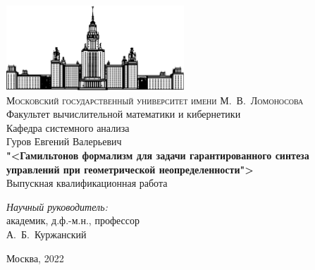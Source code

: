 \begin{titlepage}
    \begin{centering}
        \includegraphics[width=0.5\textwidth]{resources/msu.png}\\
        {\scshape Московский государственный университет имени М.~В.~Ломоносова}\\
        Факультет вычислительной математики и кибернетики\\
        Кафедра системного анализа\\
        \vfill
        {\LARGE Гуров Евгений Валерьевич}\\
        \vspace{1cm}
        {\Huge\bfseries "<Гамильтонов формализм для задачи гарантированного синтеза управлений при геометрической неопределенности">\\}
        \vspace{1cm}
        {\LARGE Выпускная квалификационная работа}\\        
    \end{centering}
    \vspace{1cm}
    \begin{flushright}
        \begin{large}
            {\itshape Научный руководитель:\\}
            академик, д.ф.-м.н., профессор\\
            А.~Б.~Куржанский
        \end{large}
    \end{flushright}
    \vfill
    \begin{centering}
        Москва, 2022\\ 
    \end{centering}
\end{titlepage}